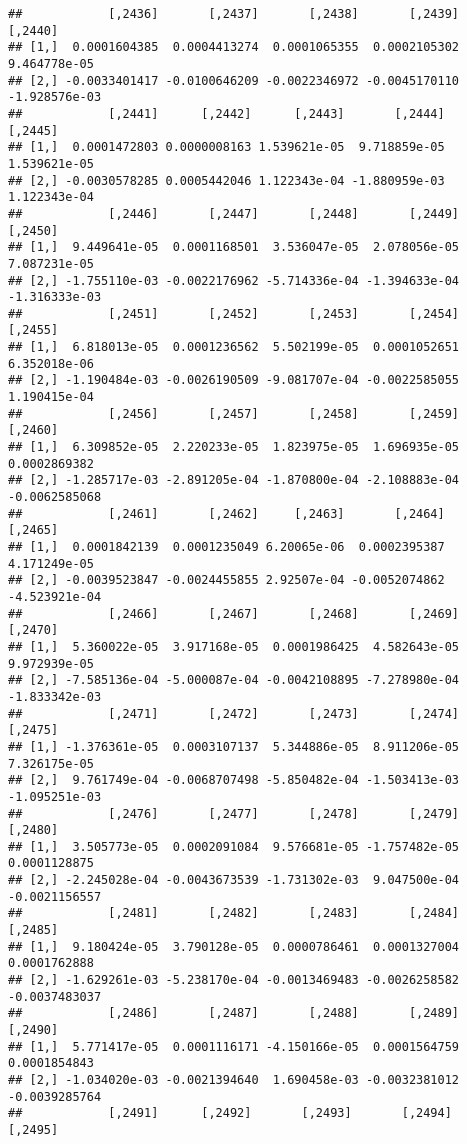 \documentclass[
]{article}
\begin{document}
\begin{verbatim}
##            [,2436]       [,2437]       [,2438]       [,2439]       [,2440]
## [1,]  0.0001604385  0.0004413274  0.0001065355  0.0002105302  9.464778e-05
## [2,] -0.0033401417 -0.0100646209 -0.0022346972 -0.0045170110 -1.928576e-03
##            [,2441]      [,2442]      [,2443]       [,2444]      [,2445]
## [1,]  0.0001472803 0.0000008163 1.539621e-05  9.718859e-05 1.539621e-05
## [2,] -0.0030578285 0.0005442046 1.122343e-04 -1.880959e-03 1.122343e-04
##            [,2446]       [,2447]       [,2448]       [,2449]       [,2450]
## [1,]  9.449641e-05  0.0001168501  3.536047e-05  2.078056e-05  7.087231e-05
## [2,] -1.755110e-03 -0.0022176962 -5.714336e-04 -1.394633e-04 -1.316333e-03
##            [,2451]       [,2452]       [,2453]       [,2454]      [,2455]
## [1,]  6.818013e-05  0.0001236562  5.502199e-05  0.0001052651 6.352018e-06
## [2,] -1.190484e-03 -0.0026190509 -9.081707e-04 -0.0022585055 1.190415e-04
##            [,2456]       [,2457]       [,2458]       [,2459]       [,2460]
## [1,]  6.309852e-05  2.220233e-05  1.823975e-05  1.696935e-05  0.0002869382
## [2,] -1.285717e-03 -2.891205e-04 -1.870800e-04 -2.108883e-04 -0.0062585068
##            [,2461]       [,2462]     [,2463]       [,2464]       [,2465]
## [1,]  0.0001842139  0.0001235049 6.20065e-06  0.0002395387  4.171249e-05
## [2,] -0.0039523847 -0.0024455855 2.92507e-04 -0.0052074862 -4.523921e-04
##            [,2466]       [,2467]       [,2468]       [,2469]       [,2470]
## [1,]  5.360022e-05  3.917168e-05  0.0001986425  4.582643e-05  9.972939e-05
## [2,] -7.585136e-04 -5.000087e-04 -0.0042108895 -7.278980e-04 -1.833342e-03
##            [,2471]       [,2472]       [,2473]       [,2474]       [,2475]
## [1,] -1.376361e-05  0.0003107137  5.344886e-05  8.911206e-05  7.326175e-05
## [2,]  9.761749e-04 -0.0068707498 -5.850482e-04 -1.503413e-03 -1.095251e-03
##            [,2476]       [,2477]       [,2478]       [,2479]       [,2480]
## [1,]  3.505773e-05  0.0002091084  9.576681e-05 -1.757482e-05  0.0001128875
## [2,] -2.245028e-04 -0.0043673539 -1.731302e-03  9.047500e-04 -0.0021156557
##            [,2481]       [,2482]       [,2483]       [,2484]       [,2485]
## [1,]  9.180424e-05  3.790128e-05  0.0000786461  0.0001327004  0.0001762888
## [2,] -1.629261e-03 -5.238170e-04 -0.0013469483 -0.0026258582 -0.0037483037
##            [,2486]       [,2487]       [,2488]       [,2489]       [,2490]
## [1,]  5.771417e-05  0.0001116171 -4.150166e-05  0.0001564759  0.0001854843
## [2,] -1.034020e-03 -0.0021394640  1.690458e-03 -0.0032381012 -0.0039285764
##            [,2491]      [,2492]       [,2493]       [,2494]       [,2495]

\end{verbatim}
\end{document}
